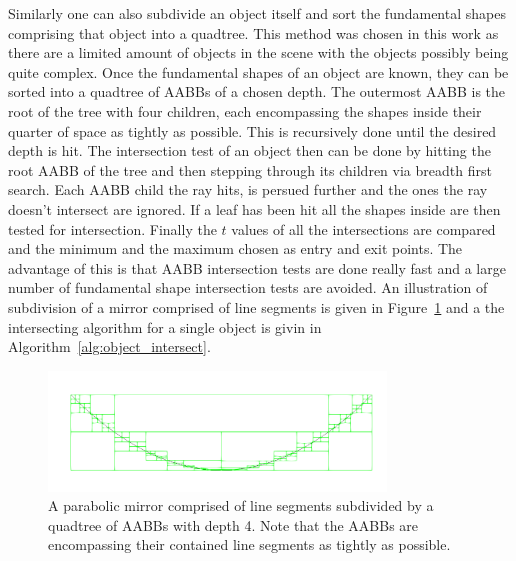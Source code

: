 \documentclass[a4paper,10pt]{article}
\newcommand{\figref}[1]{Figure~\ref{#1}}
\newcommand{\algref}[1]{Algorithm~\ref{#1}}
\begin{document}
    Similarly one can also subdivide an object itself and sort the
    fundamental shapes comprising that object into a quadtree.
    This method was chosen in this work as there are a limited amount of
    objects in the scene with the objects possibly being quite complex.
    Once the fundamental shapes of an object are known, they can be
    sorted into a quadtree of AABBs of a chosen depth.
    The outermost AABB is the root of the tree with four children,
    each encompassing the shapes inside their quarter of space
    as tightly as possible.
    This is recursively done until the desired depth is hit.
    The intersection test of an object then can be done by hitting
    the root AABB of the tree and then stepping through its children
    via breadth first search.
    Each AABB child the ray hits, is persued further and the ones
    the ray doesn't intersect are ignored.
    If a leaf has been hit all the shapes inside are then tested for
    intersection.
    Finally the $t$ values of all the intersections are compared and
    the minimum and the maximum chosen as entry and exit points. 
    The advantage of this is that AABB intersection tests are done really
    fast and a large number of fundamental shape intersection tests
    are avoided.
    An illustration of subdivision of a mirror comprised of line segments
    is given in \figref{fig:quadtree} and a the intersecting algorithm
    for a single object is givin in \algref{alg:object_intersect}.

    \begin{center}
        \begin{figure}
            \centering    
            \includegraphics[width=0.8\textwidth]{images/mirror.png}
            \caption[Subdivision using quadtrees]{
                A parabolic mirror comprised of line segments
                subdivided by a quadtree of AABBs with depth 4.
                Note that the AABBs are encompassing their contained line
                segments as tightly as possible.
            }
            \label{fig:quadtree}
        \end{figure}
    \end{center}
\end{document}
